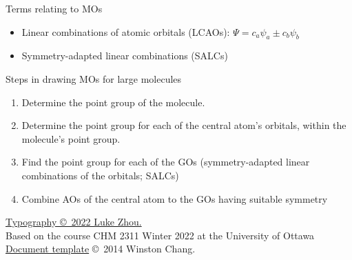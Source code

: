 \documentclass[10pt,landscape]{article}
\begin{document}
\begin{multicols}{3}
Terms relating to MOs
\begin{itemize}
	\item Linear combinations of atomic orbitals (LCAOs): $\Psi = c_a \psi_a \pm c_b \psi_b$
	\item Symmetry-adapted linear combinations (SALCs)
\end{itemize}

Steps in drawing MOs for large molecules
\begin{enumerate}
	\item Determine the point group of the molecule.
	\item Determine the point group for each of the central atom's orbitals, within the molecule's point group.
	\item Find the point group for each of the GOs (symmetry-adapted linear combinations of the orbitals; SALCs) 
	\item Combine AOs of the central atom to the GOs having suitable symmetry
\end{enumerate}


\hrulefill

\scriptsize

\href{https://github.com/zhouluke/PhysicsFormulas}{Typography \copyright\ 2022 Luke Zhou.} \\
Based on the course CHM 2311 Winter 2022 at the University of Ottawa \\
\href{http://wch.github.io/latexsheet/}{Document template}  \copyright\ 2014 Winston Chang.


\end{multicols}
\end{document}
